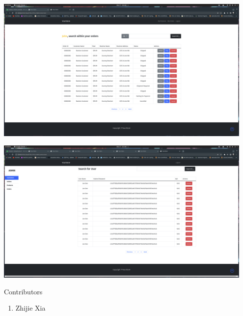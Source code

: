 \documentclass[12pt]{article}
\begin{document}
\includegraphics[width=0.95\textwidth]{Screenshots/order.png}

\includegraphics[width=0.95\textwidth]{Screenshots/admin.png}
\newpage

Contributors
\begin{enumerate}
    \item Zhijie Xia
\end{enumerate}
\end{document}
